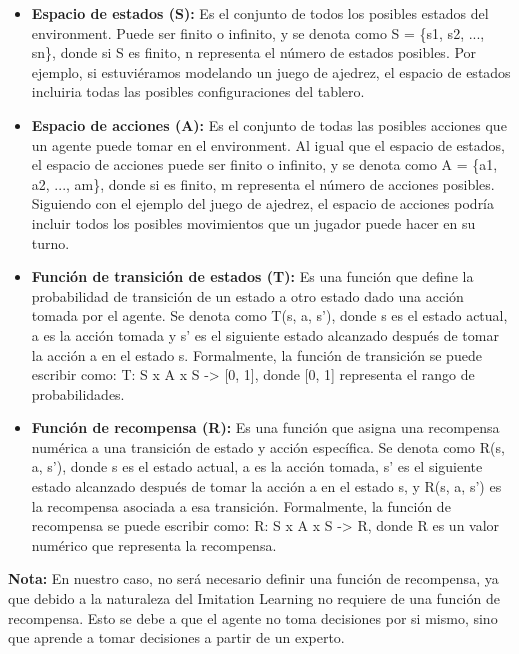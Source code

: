 \begin{itemize}
    \item \textbf{Espacio de estados (S):} Es el conjunto de todos los posibles estados del environment. 
    Puede ser finito o infinito, y se denota como S = \{s1, s2, ..., sn\}, donde si S es finito, n representa 
    el número de estados posibles. Por ejemplo, si estuviéramos modelando un juego de ajedrez, el espacio 
    de estados incluiria todas las posibles configuraciones del tablero.

    \item \textbf{Espacio de acciones (A):} Es el conjunto de todas las posibles acciones que un agente 
    puede tomar en el environment. Al igual que el espacio de estados, el espacio de acciones puede ser finito 
    o infinito, y se denota como A = \{a1, a2, ..., am\}, donde si es finito, m representa el número de 
    acciones posibles. Siguiendo con el ejemplo del juego de ajedrez, el espacio de acciones podría incluir 
    todos los posibles movimientos que un jugador puede hacer en su turno.

    \item \textbf{Función de transición de estados (T):} Es una función que define la probabilidad de transición 
    de un estado a otro estado dado una acción tomada por el agente. Se denota como T(s, a, s'), donde s es el 
    estado actual, a es la acción tomada y s' es el siguiente estado alcanzado después de tomar la acción a en 
    el estado s. Formalmente, la función de transición se puede escribir como: T: S x A x S -> [0, 1], donde 
    [0, 1] representa el rango de probabilidades.

    \item \textbf{Función de recompensa (R):} Es una función que asigna una recompensa numérica a una transición 
    de estado y acción específica. Se denota como R(s, a, s'), donde s es el estado actual, a es la acción tomada, 
    s' es el siguiente estado alcanzado después de tomar la acción a en el estado s, y R(s, a, s') es 
    la recompensa asociada a esa transición. Formalmente, la función de recompensa se puede escribir 
    como: R: S x A x S -> R, donde R es un valor numérico que representa la recompensa. 

\end{itemize}

\textbf{Nota: } En nuestro caso, no será necesario definir una función de recompensa, ya que debido a la 
naturaleza del Imitation Learning no requiere de una función de recompensa. Esto se debe a que el agente 
no toma decisiones por si mismo, sino que aprende a tomar decisiones a partir de un experto.

